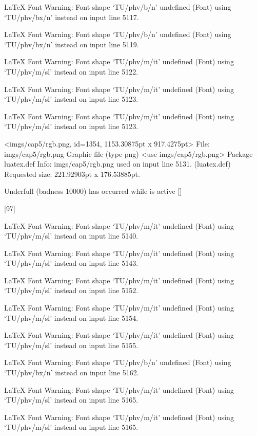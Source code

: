LaTeX Font Warning: Font shape `TU/phv/b/n' undefined
(Font)              using `TU/phv/bx/n' instead on input line 5117.


LaTeX Font Warning: Font shape `TU/phv/b/n' undefined
(Font)              using `TU/phv/bx/n' instead on input line 5119.


LaTeX Font Warning: Font shape `TU/phv/m/it' undefined
(Font)              using `TU/phv/m/sl' instead on input line 5122.


LaTeX Font Warning: Font shape `TU/phv/m/it' undefined
(Font)              using `TU/phv/m/sl' instead on input line 5123.


LaTeX Font Warning: Font shape `TU/phv/m/it' undefined
(Font)              using `TU/phv/m/sl' instead on input line 5123.

<imgs/cap5/rgb.png, id=1354, 1153.30875pt x 917.4275pt>
File: imgs/cap5/rgb.png Graphic file (type png)
<use imgs/cap5/rgb.png>
Package luatex.def Info: imgs/cap5/rgb.png  used on input line 5131.
(luatex.def)             Requested size: 221.92903pt x 176.53885pt.

Underfull \vbox (badness 10000) has occurred while \output is active []

[97]

LaTeX Font Warning: Font shape `TU/phv/m/it' undefined
(Font)              using `TU/phv/m/sl' instead on input line 5140.


LaTeX Font Warning: Font shape `TU/phv/m/it' undefined
(Font)              using `TU/phv/m/sl' instead on input line 5143.


LaTeX Font Warning: Font shape `TU/phv/m/it' undefined
(Font)              using `TU/phv/m/sl' instead on input line 5152.


LaTeX Font Warning: Font shape `TU/phv/m/it' undefined
(Font)              using `TU/phv/m/sl' instead on input line 5154.


LaTeX Font Warning: Font shape `TU/phv/m/it' undefined
(Font)              using `TU/phv/m/sl' instead on input line 5155.


LaTeX Font Warning: Font shape `TU/phv/b/n' undefined
(Font)              using `TU/phv/bx/n' instead on input line 5162.


LaTeX Font Warning: Font shape `TU/phv/m/it' undefined
(Font)              using `TU/phv/m/sl' instead on input line 5165.


LaTeX Font Warning: Font shape `TU/phv/m/it' undefined
(Font)              using `TU/phv/m/sl' instead on input line 5165.


